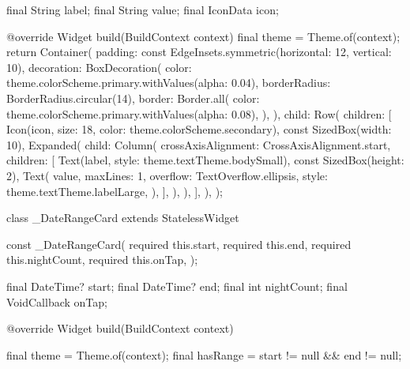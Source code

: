 \documentclass[11pt,a4paper]{article}
\begin{document}
\begin{codeblock}
{  final String label;
  final String value;
  final IconData icon;

  @override
  Widget build(BuildContext context) {
    final theme = Theme.of(context);
    return Container(
      padding: const EdgeInsets.symmetric(horizontal: 12, vertical: 10),
      decoration: BoxDecoration(
        color: theme.colorScheme.primary.withValues(alpha: 0.04),
        borderRadius: BorderRadius.circular(14),
        border: Border.all(
          color: theme.colorScheme.primary.withValues(alpha: 0.08),
        ),
      ),
      child: Row(
        children: [
          Icon(icon, size: 18, color: theme.colorScheme.secondary),
          const SizedBox(width: 10),
          Expanded(
            child: Column(
              crossAxisAlignment: CrossAxisAlignment.start,
              children: [
                Text(label, style: theme.textTheme.bodySmall),
                const SizedBox(height: 2),
                Text(
                  value,
                  maxLines: 1,
                  overflow: TextOverflow.ellipsis,
                  style: theme.textTheme.labelLarge,
                ),
              ],
            ),
          ),
        ],
      ),
    );
  }
}

class _DateRangeCard extends StatelessWidget {
  const _DateRangeCard({
    required this.start,
    required this.end,
    required this.nightCount,
    required this.onTap,
  });

  final DateTime? start;
  final DateTime? end;
  final int nightCount;
  final VoidCallback onTap;

  @override
  Widget build(BuildContext context) {
    final theme = Theme.of(context);
    final hasRange = start != null && end != null;

}}
\end{codeblock}
\end{document}
